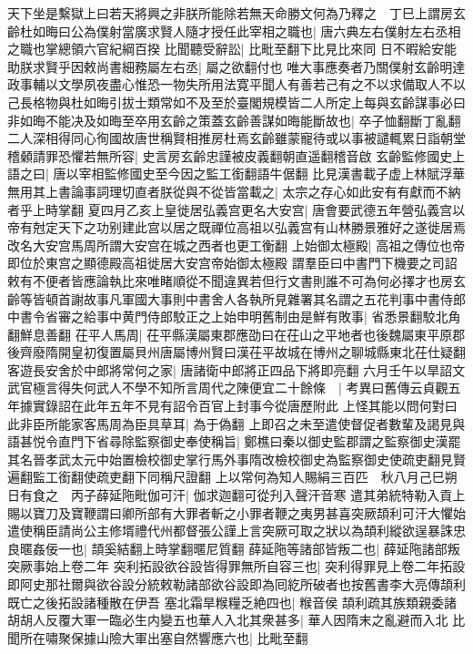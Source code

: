 天下坐是繫獄上曰若天將興之非朕所能除若無天命勝文何為乃釋之　丁巳上謂房玄齡杜如晦曰公為僕射當廣求賢人隨才授任此宰相之職也|{
	唐六典左右僕射左右丞相之職也掌總領六官紀綱百揆}
比聞聽受辭訟|{
	比毗至翻下比見比來同}
日不暇給安能助朕求賢乎因敕尚書細務屬左右丞|{
	屬之欲翻付也}
唯大事應奏者乃關僕射玄齡明達政事輔以文學夙夜盡心惟恐一物失所用法寛平聞人有善若己有之不以求備取人不以己長格物與杜如晦引拔士類常如不及至於臺閣規模皆二人所定上每與玄齡謀事必曰非如晦不能决及如晦至卒用玄齡之策蓋玄齡善謀如晦能斷故也|{
	卒子恤翻斷丁亂翻}
二人深相得同心徇國故唐世稱賢相推房杜焉玄齡雖蒙寵待或以事被譴輒累日詣朝堂稽顙請罪恐懼若無所容|{
	史言房玄齡忠謹被皮義翻朝直遥翻稽音啟}
玄齡監修國史上語之曰|{
	唐以宰相監修國史至今因之監工銜翻語牛倨翻}
比見漢書載子虚上林賦浮華無用其上書論事詞理切直者朕從與不從皆當載之|{
	太宗之存心如此安有有獻而不納者乎上時掌翻}
夏四月乙亥上皇徙居弘義宫更名大安宫|{
	唐會要武德五年營弘義宫以帝有尅定天下之功别建此宫以居之既禪位高祖以弘義宫有山林勝景雅好之遂徙居焉改名大安宫馬周所謂大安宫在城之西者也更工衡翻}
上始御太極殿|{
	高祖之傳位也帝即位於東宫之顯德殿高祖徙居大安宫帝始御太極殿}
謂羣臣曰中書門下機要之司詔敕有不便者皆應論執比來唯睹順從不聞違異若但行文書則誰不可為何必擇才也房玄齡等皆頓首謝故事凡軍國大事則中書舍人各執所見雜署其名謂之五花判事中書侍郎中書令省審之給事中黄門侍郎駮正之上始申明舊制由是鮮有敗事|{
	省悉景翻駮北角翻鮮息善翻}
茌平人馬周|{
	茌平縣漢屬東郡應劭曰在茌山之平地者也後魏屬東平原郡後齊廢隋開皇初復置屬貝州唐屬博州賢曰漢茌平故城在博州之聊城縣東北茌仕疑翻}
客遊長安舍於中郎將常何之家|{
	唐諸衛中郎將正四品下將即亮翻}
六月壬午以旱詔文武官極言得失何武人不學不知所言周代之陳便宜二十餘條　|{
	考異曰舊傳云貞觀五年據實錄詔在此年五年不見有詔令百官上封事今從唐歷附此}
上怪其能以問何對曰此非臣所能家客馬周為臣具草耳|{
	為于偽翻}
上即召之未至遣使督促者數輩及謁見與語甚悦令直門下省尋除監察御史奉使稱旨|{
	鄭樵曰秦以御史監郡謂之監察御史漢罷其名晉孝武太元中始置檢校御史掌行馬外事隋改檢校御史為監察御史使疏吏翻見賢遍翻監工銜翻使疏吏翻下同稱尺證翻}
上以常何為知人賜絹三百匹　秋八月己巳朔日有食之　丙子薛延陁毗伽可汗|{
	伽求迦翻可從刋入聲汗音寒}
遣其弟統特勒入貢上賜以寶刀及寶鞭謂曰卿所部有大罪者斬之小罪者鞭之夷男甚喜突厥頡利可汗大懼始遣使稱臣請尚公主修壻禮代州都督張公謹上言突厥可取之狀以為頡利縱欲逞暴誅忠良暱姦佞一也|{
	頡奚結翻上時掌翻暱尼質翻}
薛延陁等諸部皆叛二也|{
	薛延陁諸部叛突厥事始上卷二年}
突利拓設欲谷設皆得罪無所自容三也|{
	突利得罪見上卷二年拓設即阿史那社爾與欲谷設分統敕勒諸部欲谷設即為囘紇所破者也按舊書李大亮傳頡利既亡之後拓設諸種散在伊吾}
塞北霜旱糇糧乏絶四也|{
	糇音侯}
頡利疏其族類親委諸胡胡人反覆大軍一臨必生内變五也華人入北其衆甚多|{
	華人因隋末之亂避而入北}
比聞所在嘯聚保據山險大軍出塞自然響應六也|{
	比毗至翻}
